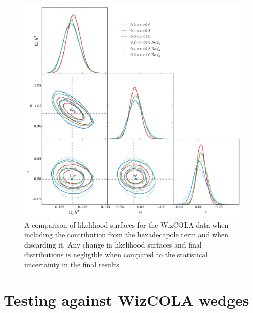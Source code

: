 \documentclass[titlesmallcaps, examinerscopy, copyrightpage]{uqthesis}
\begin{document}
\begin{figure}[h!]
  \begin{center}
    \includegraphics[width=\textwidth]{images/wizmpfastComp.pdf}
  \end{center}
  \caption{A comparison of likelihood surfaces for the WizCOLA data when including the contribution from the hexadecapole term and when discarding it. Any change in likelihood surfaces and final distributions is negligible when compared to the statistical uncertainty in the final results.}
  \label{fig:wizmpfastComp}
\end{figure}





\pagebreak
\section{Testing against WizCOLA wedges}
\end{document}
